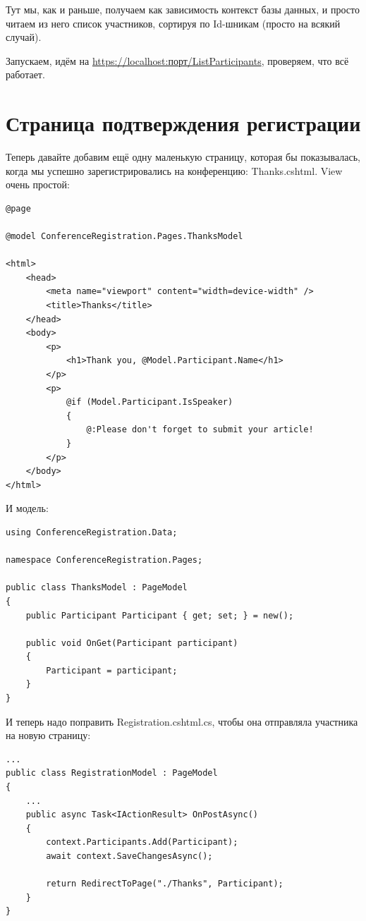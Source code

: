 \documentclass[a5paper]{article}
\begin{document}
Тут мы, как и раньше, получаем как зависимость контекст базы данных, и просто читаем из него список участников, сортируя по Id-шникам (просто на всякий случай).

Запускаем, идём на \url{https://localhost:порт/ListParticipants}, проверяем, что всё работает.

\section{Страница подтверждения регистрации}

Теперь давайте добавим ещё одну маленькую страницу, которая бы показывалась, когда мы успешно зарегистрировались на конференцию: Thanks.cshtml. View очень простой:

\begin{verbatim}
@page

@model ConferenceRegistration.Pages.ThanksModel

<html>
    <head>
        <meta name="viewport" content="width=device-width" />
        <title>Thanks</title>
    </head>
    <body>
        <p>
            <h1>Thank you, @Model.Participant.Name</h1>
        </p>
        <p>
            @if (Model.Participant.IsSpeaker)
            {
                @:Please don't forget to submit your article!
            }
        </p>
    </body>
</html>
\end{verbatim}

И модель: 

\begin{verbatim}
using ConferenceRegistration.Data;

namespace ConferenceRegistration.Pages;

public class ThanksModel : PageModel
{
    public Participant Participant { get; set; } = new();

    public void OnGet(Participant participant)
    {
        Participant = participant;
    }
}
\end{verbatim}

И теперь надо поправить Registration.cshtml.cs, чтобы она отправляла участника на новую страницу:

\begin{verbatim}
...
public class RegistrationModel : PageModel
{
    ...
    public async Task<IActionResult> OnPostAsync()
    {
        context.Participants.Add(Participant);
        await context.SaveChangesAsync();

        return RedirectToPage("./Thanks", Participant);
    }
}
\end{verbatim}
\end{document}
